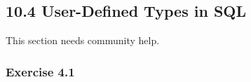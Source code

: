 \documentclass[../../main.tex]{subfiles}
\begin{document}
\subsection{10.4 User-Defined Types in SQL}

This section needs community help.

\subsubsection*{Exercise 4.1}
\end{document}
